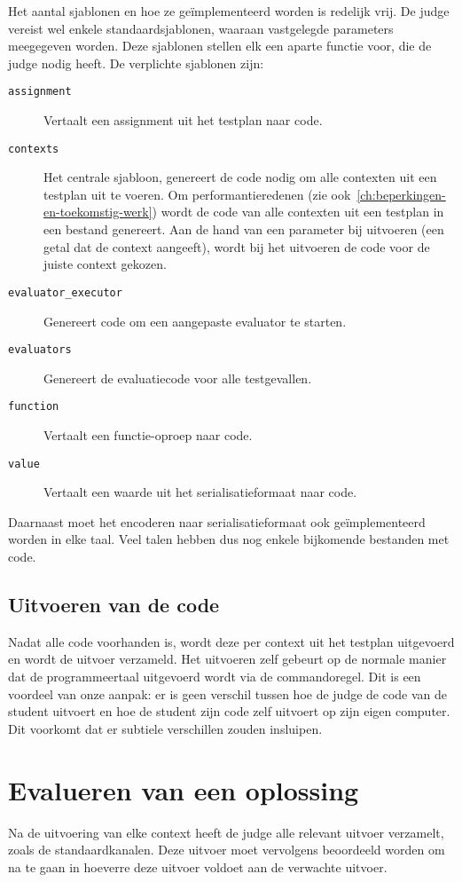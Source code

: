 Het aantal sjablonen en hoe ze geïmplementeerd worden is redelijk vrij.
De judge vereist wel enkele standaardsjablonen, waaraan vastgelegde parameters meegegeven worden.
Deze sjablonen stellen elk een aparte functie voor, die de judge nodig heeft.
De verplichte sjablonen zijn:
\begin{description}
    \item[\texttt{assignment}] Vertaalt een assignment uit het testplan naar code.
    \item[\texttt{contexts}] Het centrale sjabloon, genereert de code nodig om alle contexten uit een testplan uit te voeren.
    Om performantieredenen (zie ook~\cref{ch:beperkingen-en-toekomstig-werk}) wordt de code van alle contexten uit een testplan in een bestand genereert.
    Aan de hand van een parameter bij uitvoeren (een getal dat de context aangeeft), wordt bij het uitvoeren de code voor de juiste context gekozen.
    \item[\texttt{evaluator\_executor}] Genereert code om een aangepaste evaluator te starten.
    \item[\texttt{evaluators}] Genereert de evaluatiecode voor alle testgevallen.
    \item[\texttt{function}] Vertaalt een functie-oproep naar code.
    \item[\texttt{value}] Vertaalt een waarde uit het serialisatieformaat naar code.
\end{description}

Daarnaast moet het encoderen naar serialisatieformaat ook geïmplementeerd worden in elke taal.
Veel talen hebben dus nog enkele bijkomende bestanden met code.

\subsection{Uitvoeren van de code}\label{subsec:uitvoeren-van-de-code}

Nadat alle code voorhanden is, wordt deze per context uit het testplan uitgevoerd en wordt de uitvoer verzameld.
Het uitvoeren zelf gebeurt op de normale manier dat de programmeertaal uitgevoerd wordt via de commandoregel.
Dit is een voordeel van onze aanpak: er is geen verschil tussen hoe de judge de code van de student uitvoert en hoe de student zijn code zelf uitvoert op zijn eigen computer.
Dit voorkomt dat er subtiele verschillen zouden insluipen.


\section{Evalueren van een oplossing}\label{sec:evalueren-van-een-oplossing2}

Na de uitvoering van elke context heeft de judge alle relevant uitvoer verzamelt, zoals de standaardkanalen.
Deze uitvoer moet vervolgens beoordeeld worden om na te gaan in hoeverre deze uitvoer voldoet aan de verwachte uitvoer.
